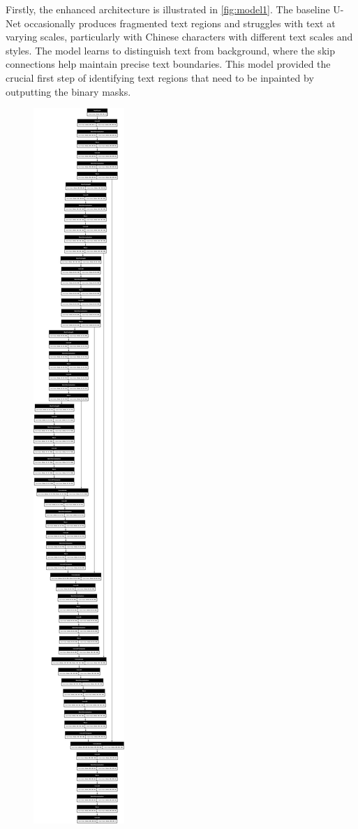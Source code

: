 \documentclass[10pt,twocolumn,letterpaper]{article}
\begin{document}
Firstly, the enhanced architecture is illustrated in \cref{fig:model1}. The baseline U-Net occasionally produces fragmented text regions and 
struggles with text at varying scales, particularly with Chinese characters with different text scales and styles. The model learns to distinguish text 
from background, where the skip connections help maintain precise text boundaries. This model provided the crucial first step of identifying text regions 
that need to be inpainted by outputting the binary masks. 

\begin{figure}[t]
    \centering
    \includegraphics[width=\linewidth]{figures/milestone/model.png}

\end{figure}
\end{document}
